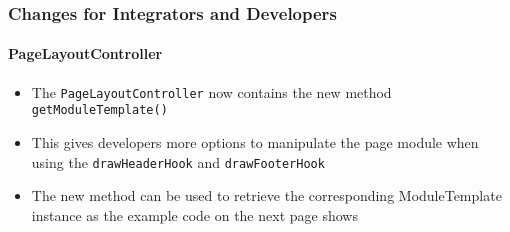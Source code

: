%

\begin{frame}[fragile]
	\frametitle{Changes for Integrators and Developers}
	\framesubtitle{PageLayoutController}

	\begin{itemize}
		\item The \texttt{PageLayoutController} now contains the new method\newline
			\texttt{getModuleTemplate()}
		\item This gives developers more options to manipulate the page module
			when using the \texttt{drawHeaderHook} and \texttt{drawFooterHook}
		\item The new method can be used to retrieve the corresponding ModuleTemplate
			instance as the example code on the next page shows
	\end{itemize}

\end{frame}

